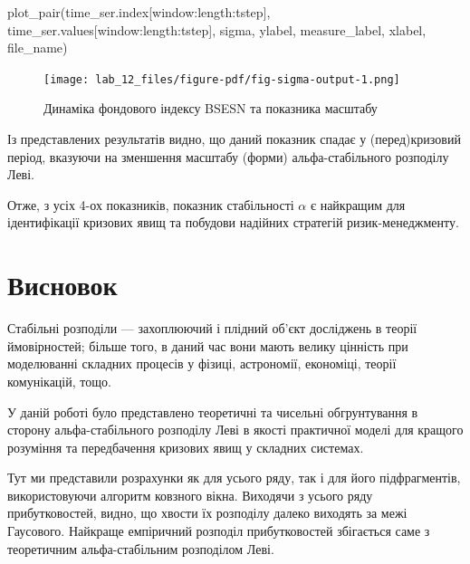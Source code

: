 \documentclass[
  letterpaper,
]{report}
\newenvironment{Shaded}{\begin{snugshade}}{\end{snugshade}}
\newcommand{\NormalTok}[1]{\textcolor[rgb]{0.00,0.23,0.31}{#1}}
\begin{document}
\begin{Shaded}
\begin{Highlighting}[]
\NormalTok{plot\_pair(time\_ser.index[window:length:tstep],}
\NormalTok{          time\_ser.values[window:length:tstep],}
\NormalTok{          sigma, }
\NormalTok{          ylabel, }
\NormalTok{          measure\_label,}
\NormalTok{          xlabel,}
\NormalTok{          file\_name)}
\end{Highlighting}
\end{Shaded}

\begin{figure}[H]

{\centering \texttt{[image: lab\_12\_files/figure-pdf/fig-sigma-output-1.png]}

}

\caption{\label{fig-sigma}Динаміка фондового індексу BSESN та показника
масштабу}

\end{figure}

Із представлених результатів видно, що даний показник спадає у
(перед)кризовий період, вказуючи на зменшення масштабу (форми)
альфа-стабільного розподілу Леві.

Отже, з усіх 4-ох показників, показник стабільності \(\alpha\) є
найкращим для ідентифікації кризових явищ та побудови надійних стратегій
ризик-менеджменту.

\hypertarget{ux432ux438ux441ux43dux43eux432ux43eux43a-2}{%
\section{Висновок}\label{ux432ux438ux441ux43dux43eux432ux43eux43a-2}}

Стабільні розподіли --- захоплюючий і плідний об'єкт досліджень в теорії
ймовірностей; більше того, в даний час вони мають велику цінність при
моделюванні складних процесів у фізиці, астрономії, економіці, теорії
комунікацій, тощо.

У даній роботі було представлено теоретичні та чисельні обгрунтування в
сторону альфа-стабільного розподілу Леві в якості практичної моделі для
кращого розуміння та передбачення кризових явищ у складних системах.

Тут ми представили розрахунки як для усього ряду, так і для його
підфрагментів, використовуючи алгоритм ковзного вікна. Виходячи з усього
ряду прибутковостей, видно, що хвости їх розподілу далеко виходять за
межі Гаусового. Найкраще емпіричний розподіл прибутковостей збігається
саме з теоретичним альфа-стабільним розподілом Леві.
\end{document}
